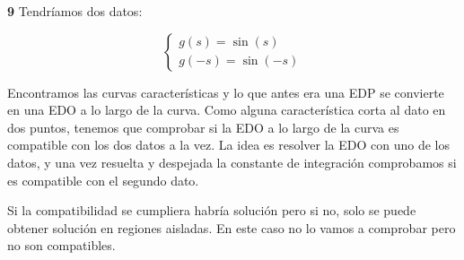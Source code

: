 \begin{example}{\bf 9}
		Tendríamos dos datos:

		\[
		\begin{cases}
		g(s) = \sin(s) \\
		g(-s) = \sin(-s)
		\end{cases}
		\]

		Encontramos las curvas características y lo que antes era una EDP se convierte en una EDO a lo largo de la curva. Como alguna característica corta al dato en dos puntos, tenemos que comprobar si la EDO a lo largo de la curva es compatible con los dos datos a la vez. La idea es resolver la EDO con uno de los datos, y una vez resuelta y despejada la constante de integración comprobamos si es compatible con el segundo dato.

		Si la compatibilidad se cumpliera habría solución pero si no, solo se puede obtener solución en regiones aisladas. En este caso no lo vamos a comprobar pero no son compatibles.



	\end{example}
